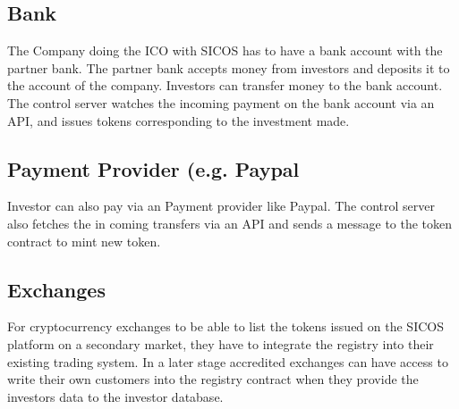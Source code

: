 \documentclass[11pt]{article}
\begin{document}
\subsection{Bank}
The Company doing the ICO with SICOS has to have a bank account with the partner bank. The partner bank accepts money from investors and deposits it to the account of the company. 
Investors can transfer money to the bank account. The control server watches the incoming payment on the bank account via an API, and issues tokens corresponding to the investment made.

\subsection{Payment Provider (e.g. Paypal}
Investor can also pay via an Payment provider like Paypal. The control server also fetches the in coming transfers via an API and sends a message to the token contract to mint new token.

\subsection{Exchanges}
For cryptocurrency exchanges to be able to list the tokens issued on the SICOS platform on a secondary market, they have to integrate the registry into their existing trading system. In a later stage accredited exchanges can have access to write their own customers into the registry contract when they provide the investors data to the investor database. 
\end{document}
